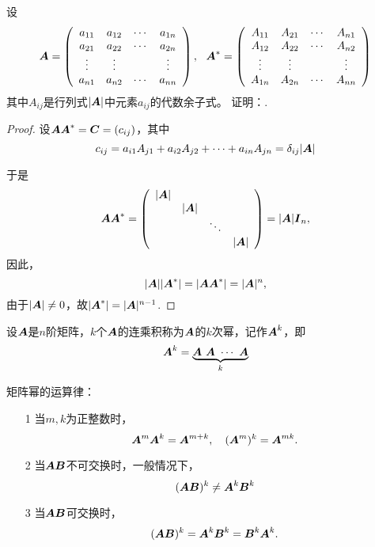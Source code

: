 \begin{li}
  设
  $$
  \boldsymbol{A} = \left(
    \begin{array}{cccc}
      a_{11} & a_{12} & \cdots & a_{1n} \\
      a_{21} & a_{22} & \cdots & a_{2n} \\
      \vdots   & \vdots   &     & \vdots   \\
      a_{n1} & a_{n2} & \cdots & a_{nn} \\
    \end{array}
  \right), ~~
  \boldsymbol{A}^* = \left(
    \begin{array}{cccc}
      A_{11} & A_{21} & \cdots & A_{n1} \\
      A_{12} & A_{22} & \cdots & A_{n2} \\
      \vdots   & \vdots   &     & \vdots   \\
      A_{1n} & A_{2n} & \cdots & A_{nn} \\
    \end{array}
  \right)
  $$
  其中$A_{ij}$是行列式$|\boldsymbol{A}|$中元素$a_{ij}$的代数余子式。
  证明：.      
\end{li}
\begin{proof}      
  设$\boldsymbol{A}\boldsymbol{A}^*=\boldsymbol{C}=(c_{ij})$，其中
  $$
  c_{ij} = a_{i1}A_{j1} + a_{i2}A_{j2} + \cdots + a_{in}A_{jn} = \delta_{ij}|\boldsymbol{A}|
  $$
  
  于是
  $$
  \boldsymbol{A}\boldsymbol{A}^* = \left(
    \begin{array}{cccc}
      |\boldsymbol{A}|&&&\\
          &|\boldsymbol{A}|&&\\
          &&\ddots&\\
          &&&|\boldsymbol{A}|
    \end{array}
  \right) = |\boldsymbol{A}| \boldsymbol{I}_n,
  $$ 
  因此，
  $$
  |\boldsymbol{A}||\boldsymbol{A}^*| = |\boldsymbol{A}\boldsymbol{A}^*| = |\boldsymbol{A}|^n,
  $$ 
  由于$|\boldsymbol{A}|\ne 0$，故$|\boldsymbol{A}^*|=|\boldsymbol{A}|^{n-1}$.
\end{proof}
% 

% 
% 
\begin{dingyi}[矩阵幂]
  设$\boldsymbol{A}$是$n$阶矩阵，$k$个$\boldsymbol{A}$的连乘积称为$\boldsymbol{A}$的$k$次幂，记作$\boldsymbol{A}^k$，即
  $$
  \boldsymbol{A}^k = \underbrace{\boldsymbol{A}~ \boldsymbol{A}~ \cdots ~\boldsymbol{A}}_{k}
  $$
\end{dingyi}
% 
矩阵幂的运算律：
\begin{itemize}
\item[1] 当$m,k$为正整数时，
  $$
  \boldsymbol{A}^m \boldsymbol{A}^k = \boldsymbol{A}^{m+k}, \quad
  (\boldsymbol{A}^m)^k = \boldsymbol{A}^{mk}.
  $$  
\item[2]
  当$\boldsymbol{A}\boldsymbol{B}$不可交换时，一般情况下，
  $$
  (\boldsymbol{A}\boldsymbol{B})^k \ne \boldsymbol{A}^k\boldsymbol{B}^k 
  $$  
\item[3]
  当$\boldsymbol{A}\boldsymbol{B}$可交换时，
  $$
  (\boldsymbol{A}\boldsymbol{B})^k = \boldsymbol{A}^k\boldsymbol{B}^k =  \boldsymbol{B}^k\boldsymbol{A}^k. 
  $$
\end{itemize}

